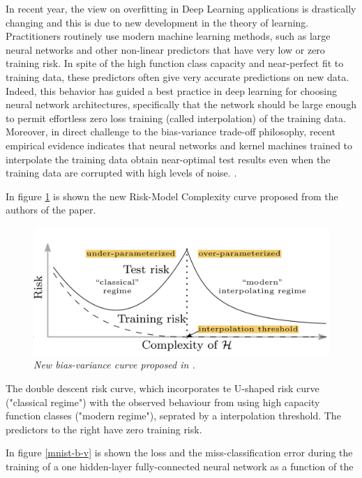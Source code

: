 \documentclass[11pt,a4paper]{article}
\begin{document}
In recent year, the view on overfitting in Deep Learning applications is drastically changing and this is due to new development in the theory of learning.
Practitioners routinely use modern machine learning methods, such as large neural networks and other non-linear predictors that have very low or zero training risk. In spite of the high function class capacity and near-perfect fit to training data, these predictors often give very accurate predictions on new data. Indeed, this behavior has guided a best practice in deep learning for choosing neural network architectures, specifically that the network should be large enough to permit effortless zero loss training (called interpolation) of the training data. Moreover, in direct challenge to the bias-variance trade-off philosophy, recent empirical evidence indicates that neural networks and kernel machines trained to interpolate the training data obtain near-optimal test results even when the training data are corrupted with high levels of noise. \cite{doubleU}.

In figure \ref{bias-variance-tradeoff-new} is shown the new Risk-Model Complexity curve proposed from the authors of the paper.

\begin{figure}[H]
 \centering
 \includegraphics[scale=0.5]{../images/new-curve.png}
 \caption{\textit{New bias-variance curve proposed in \cite{doubleU}.}}  
 \label{bias-variance-tradeoff-new}
\end{figure}

The double descent risk curve, which incorporates te U-shaped risk curve ("classical regime") with the observed behaviour from using high capacity function classes ("modern regime"), seprated by a interpolation threshold. The predictors to the right have zero training risk.

In figure \ref{mnist-b-v} is shown the loss and the miss-classification error during the training of a one hidden-layer fully-connected neural network as a function of the
\end{document}
